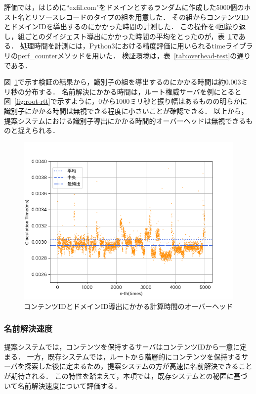 評価では，はじめに``exfil.com"をドメインとするランダムに作成した5000個のホスト名とリソースレコードのタイプの組を用意した．
その組からコンテンツIDとドメインIDを導出するのにかかった時間の計測した．
この操作を4回繰り返し，組ごとのダイジェスト導出にかかった時間の平均をとったのが，表~\ref{fig:overhead}である．
処理時間を計測には，Python3における精度評価に用いられるtimeライブラリのperf\_counterメソッドを用いた．
検証環境は，表~\ref{tab:overhead-test}の通りである．



図~\ref{fig:overhead}で示す検証の結果から，識別子の組を導出するのにかかる時間は約0.003ミリ秒の分布する．
名前解決にかかる時間は，ルート権威サーバを例にとると図~\ref{fig:root-rtt}で示すように，0から1000ミリ秒と振り幅はあるものの明らかに識別子にかかる時間は無視できる程度に小さいことが確認できる．
以上から，提案システムにおける識別子導出にかかる時間的オーバーヘッドは無視できるものと捉えられる．

\begin{figure}[htbp]
 \centering
 \includegraphics[scale=0.8]{figure/overhead.png}
 \caption[識別子導出にかかる時間的オーバーヘッド]{コンテンツIDとドメインID導出にかかる計算時間のオーバーヘッド}
 \label{fig:overhead}
\end{figure}


\newpage
\subsubsection{名前解決速度}
\label{sec:resolution_speed}
提案システムでは，コンテンツを保持するサーバはコンテンツIDから一意に定まる．
一方，既存システムでは，ルートから階層的にコンテンツを保持するサーバを探索した後に定まるため，提案システムの方が高速に名前解決できることが期待される．
この特性を踏まえて，本項では，既存システムとの秘匿に基づいて名前解決速度について評価する．

